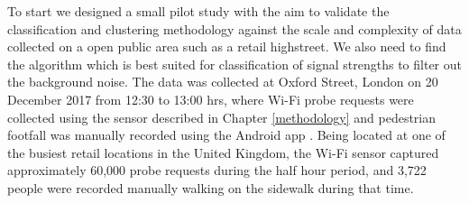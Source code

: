 To start we designed a small pilot study with the aim to validate the classification and clustering methodology against the scale and complexity of data collected on a open public area such as a retail highstreet.
We also need to find the algorithm which is best suited for classification of signal strengths to filter out the background noise.
The data was collected at Oxford Street, London on 20 December 2017 from 12:30 to 13:00 hrs, where Wi-Fi probe requests were collected using the sensor described in Chapter \ref{methodology} and pedestrian footfall was manually recorded using the Android app \citep{bala2018clicker}.
Being located at one of the busiest retail locations in the United Kingdom, the Wi-Fi sensor captured approximately 60,000 probe requests during the half hour period, and 3,722 people were recorded manually walking on the sidewalk during that time.

